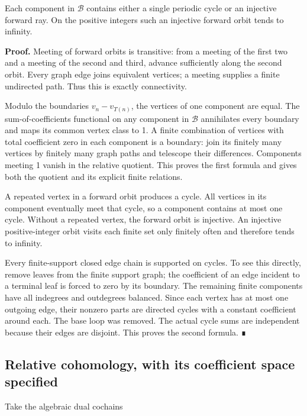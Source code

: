 Each component in \(\mathcal B\) contains either a single periodic cycle
or an injective forward ray. On the positive integers such an injective
forward orbit tends to infinity.

\textbf{Proof.} Meeting of forward orbits is transitive: from a meeting
of the first two and a meeting of the second and third, advance
sufficiently along the second orbit. Every graph edge joins equivalent
vertices; a meeting supplies a finite undirected path. Thus this is
exactly connectivity.

Modulo the boundaries \(v_n-v_{T(n)}\), the vertices of one component
are equal. The sum-of-coefficients functional on any component in
\(\mathcal B\) annihilates every boundary and maps its common vertex
class to 1. A finite combination of vertices with total coefficient zero
in each component is a boundary: join its finitely many vertices by
finitely many graph paths and telescope their differences. Components
meeting 1 vanish in the relative quotient. This proves the first formula
and gives both the quotient and its explicit finite relations.

A repeated vertex in a forward orbit produces a cycle. All vertices in
its component eventually meet that cycle, so a component contains at
most one cycle. Without a repeated vertex, the forward orbit is
injective. An injective positive-integer orbit visits each finite set
only finitely often and therefore tends to infinity.

Every finite-support closed edge chain is supported on cycles. To see
this directly, remove leaves from the finite support graph; the
coefficient of an edge incident to a terminal leaf is forced to zero by
its boundary. The remaining finite components have all indegrees and
outdegrees balanced. Since each vertex has at most one outgoing edge,
their nonzero parts are directed cycles with a constant coefficient
around each. The base loop was removed. The actual cycle sums are
independent because their edges are disjoint. This proves the second
formula. ∎

\subsection{Relative cohomology, with its coefficient space specified}

Take the algebraic dual cochains


